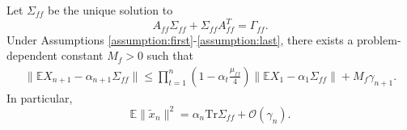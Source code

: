\begin{lemma}\label{lem:fast_mse}
    Let $\Sigma_{ff}$ be the unique solution to 
    \begin{equation}\label{eq:fast_covariance}
        A_{ff} \Sigma_{ff} + \Sigma_{ff} A_{ff}^T = \Gamma_{ff} .
    \end{equation}
    Under Assumptions \ref{assumption:first}-\ref{assumption:last}, there exists a problem-dependent constant $M_f > 0$ such that 
    \begin{align*}
        \lVert \mathbb{E} X_{n+1} - \alpha_{n+1} \Sigma_{ff}\rVert \leq 
        \prod_{t=1}^n \left(1 - \alpha_t \frac{\mu_{ff}}{4}\right) \lVert \mathbb{E} X_1 - \alpha_1 \Sigma_{ff} \rVert + M_f \gamma_{n+1} .
    \end{align*}
    In particular,
    \begin{equation}    
        \mathbb{E} \lVert \tilde{x}_n \rVert^2 
        = \alpha_n \mathrm{Tr} \Sigma_{ff} + \mathcal{O}\left( \gamma_n \right) . 
    \end{equation}
\end{lemma}


